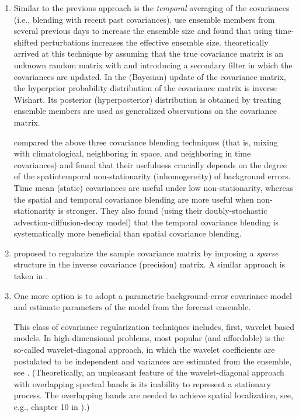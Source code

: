 \documentclass[12pt]{article}
\newcommand{\ie}{i.e., }
\begin{document}
\begin{enumerate}
\item
Similar to the previous approach is the {\em temporal} averaging of the covariances
(\ie blending with recent past covariances).
\citet[][]{Berre2015,Bonavita}  use ensemble members from several previous days to increase the ensemble size
and
\citet[][]{Lorenc2017} found that using time-shifted perturbations
increases the effective ensemble size.
\citet{HBEF} theoretically arrived at this technique by  assuming
that the true covariance matrix is an
unknown random matrix with and introducing a secondary filter in which the covariances are updated.
In the (Bayesian) update of the covariance matrix,
the hyperprior probability distribution of the covariance matrix is inverse Wishart.
Its posterior  (hyperposterior) distribution is obtained by treating
ensemble members are used as generalized observations
on the covariance matrix.

\citet{DSADM} compared the above three covariance blending techniques
(that is, mixing with climatological, neighboring in space, and neighboring in time
covariances) and found that their usefulness crucially depends on the degree of the
spatiotemporal non-stationarity (inhomogeneity) of background errors.
Time mean (static) covariances
are useful under low non-stationarity, whereas the spatial and temporal covariance blending
are more useful when non-stationarity is stronger. They also found
(using their doubly-stochastic advection-diffusion-decay model)
that the temporal covariance
blending is systematically more beneficial than spatial covariance
blending.



\item
\citep{Ueno} proposed to regularize the sample covariance matrix by imposing
a {\em sparse} structure in the inverse covariance (precision) matrix.
A similar approach is taken  in \citet{Hou}.



\item
One more option is to adopt a parametric background-error covariance model and estimate
parameters of the model from the forecast ensemble. 

This class of covariance regularization techniques includes, first, wavelet based models.
In high-dimensional problems, most popular (and affordable) 
is the so-called wavelet-diagonal approach, in which
the wavelet coefficients are postulated to be independent and variances are estimated from the ensemble,
see \citep{Fisher,Berre2015, Mandel}. (Theoretically, an unpleasant feature of the 
wavelet-diagonal approach with overlapping spectral bands  
is its inability to represent a stationary process. The overlapping bands are needed  
to achieve spatial localization, see, e.g., chapter 10 in \citet[][]{Marinucci}).)


\end{enumerate}
\end{document}
